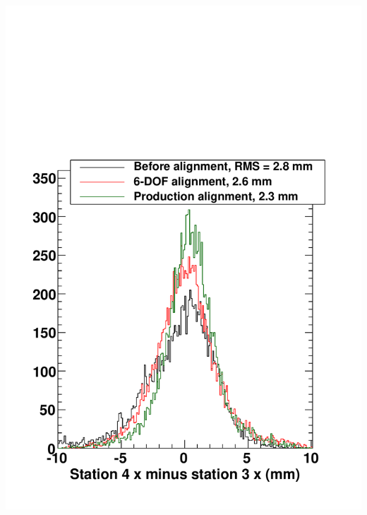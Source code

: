 \documentclass[compress]{beamer}
\begin{document}
\begin{frame}
\begin{columns}
\includegraphics[width=\linewidth]{residuals_xdifffid1cut_34.pdf}
\end{columns}
\end{frame}
\end{document}
